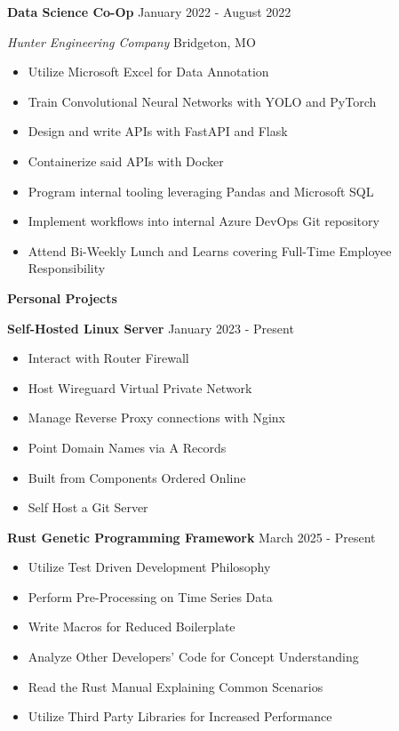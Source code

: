 \documentclass[11pt]{article}
\begin{document}

\textbf{Data Science Co-Op} \hfill January 2022 - August 2022

\textsl{Hunter Engineering Company} \hfill Bridgeton, MO
\begin{itemize}[noitemsep]
    \item Utilize Microsoft Excel for Data Annotation
    \item Train Convolutional Neural Networks with YOLO and PyTorch
    \item Design and write APIs with FastAPI and Flask
    \item Containerize said APIs with Docker
    \item Program internal tooling leveraging Pandas and Microsoft SQL
    \item Implement workflows into internal Azure DevOps Git repository
    \item Attend Bi-Weekly Lunch and Learns covering Full-Time Employee Responsibility
\end{itemize}


\begin{center}
    \textbf{Personal Projects}
\end{center}

\textbf{Self-Hosted Linux Server} \hfill January 2023 - Present
\begin{itemize}[noitemsep]
    \item Interact with Router Firewall
    \item Host Wireguard Virtual Private Network
    \item Manage Reverse Proxy connections with Nginx
    \item Point Domain Names via A Records
    \item Built from Components Ordered Online
    \item Self Host a Git Server
\end{itemize}

\textbf{Rust Genetic Programming Framework} \hfill March 2025 - Present
\begin{itemize}[noitemsep]
    \item Utilize Test Driven Development Philosophy
    \item Perform Pre-Processing on Time Series Data
    \item Write Macros for Reduced Boilerplate
    \item Analyze Other Developers' Code for Concept Understanding
    \item Read the Rust Manual Explaining Common Scenarios
    \item Utilize Third Party Libraries for Increased Performance
\end{itemize}
\end{document}

